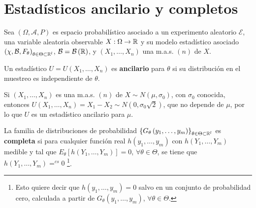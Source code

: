 \section{Estadísticos ancilario y completos}
Sea $\displaystyle \left(\Omega, \mathcal{A}, P\right) $ es espacio probabilístico asociado a un experimento aleatorio $\displaystyle \mathcal{E} $, una variable aleatoria observable $\displaystyle X : \Omega \to \mathbb{R} $ y su modelo estadístico asociado $\displaystyle \left(\chi, \mathcal{B}, F_{\theta}\right)_{\theta \in \Theta \subset \mathbb{R}^{l}} $, $\displaystyle \mathcal{B}=\mathcal{B}\left(\mathbb{R}\right) $, y $\displaystyle \left(X_{1}, \ldots, X_{n}\right) $ una m.a.s. $\displaystyle \left(n\right) $ de $\displaystyle X $. 
\begin{definition}
Un estadístico $\displaystyle U = U\left(X_{1}, \ldots, X_{n}\right) $ es \textbf{ancilario} para $\displaystyle \theta $ si su distribución en el muestreo es independiente de $\displaystyle \theta $. 
\end{definition}
\begin{eg}
Si $\displaystyle \left(X_{1}, \ldots, X_{n}\right) $ es una m.a.s. $\displaystyle \left(n\right) $ de $\displaystyle X \sim N\left(\mu, \sigma_{0}\right) $, con $\displaystyle \sigma_{0} $ conocida, entonces $\displaystyle U\left(X_{1}, \ldots, X_{n}\right)=X_{1}-X_{2}\sim N\left(0,\sigma_{0}\sqrt{2}\right) $, que no depende de $\displaystyle \mu $, por lo que $\displaystyle U $ es un estadístico ancilario para $\displaystyle \mu $. 
\end{eg}
\begin{definition}
	La familia de distribuciones de probabilidad $\displaystyle \left\{ G_{\theta}\left(y_{1}, \ldots, y_{m}\right)\right\} _{\theta\in\Theta\subset\mathbb{R}^{l}} $ es \textbf{completa} si para cualquier función real $\displaystyle h\left(y_{1}, \ldots, y_{m}\right) $ con $\displaystyle h\left(Y_{1}, \ldots, Y_{m}\right) $ medible y tal que $\displaystyle E_{\theta}\left[h\left(Y_{1}, \ldots, Y_{m}\right)\right] =0 $, $\displaystyle \forall \theta \in \Theta $, se tiene que $\displaystyle h\left(Y_{1}, \ldots, Y_{m}\right)=^{cs}0 $ \footnote{Esto quiere decir que $\displaystyle h\left(y_{1}, \ldots, y_{m}\right)= 0$ salvo en un conjunto de probabilidad cero, calculada a partir de $\displaystyle G_{\theta}\left(y_{1}, \ldots, y_{m}\right) $, $\displaystyle \forall \theta \in \Theta $.}.
\end{definition}
